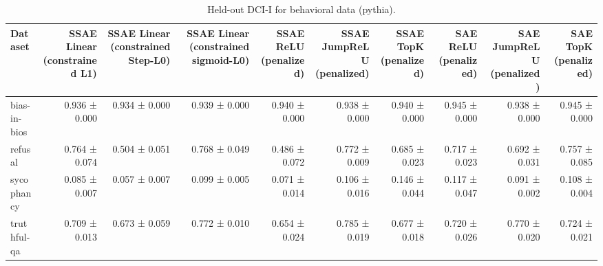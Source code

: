 \begin{table}[t]
\centering
\caption{Held-out DCI-I for behavioral data (pythia).}
\label{tab:behavioral-pythia-dci-i}
\begin{tabular}{lrrrrrrrrr}
\toprule
Dataset & SSAE Linear (constrained L1) & SSAE Linear (constrained Step-L0) & SSAE Linear (constrained sigmoid-L0) & SSAE ReLU (penalized) & SSAE JumpReLU (penalized) & SSAE TopK (penalized) & SAE ReLU (penalized) & SAE JumpReLU (penalized) & SAE TopK (penalized) \\
\midrule
bias-in-bios & 0.936 ± 0.000 & 0.934 ± 0.000 & 0.939 ± 0.000 & 0.940 ± 0.000 & 0.938 ± 0.000 & 0.940 ± 0.000 & 0.945 ± 0.000 & 0.938 ± 0.000 & 0.945 ± 0.000 \\
refusal & 0.764 ± 0.074 & 0.504 ± 0.051 & 0.768 ± 0.049 & 0.486 ± 0.072 & 0.772 ± 0.009 & 0.685 ± 0.023 & 0.717 ± 0.023 & 0.692 ± 0.031 & 0.757 ± 0.085 \\
sycophancy & 0.085 ± 0.007 & 0.057 ± 0.007 & 0.099 ± 0.005 & 0.071 ± 0.014 & 0.106 ± 0.016 & 0.146 ± 0.044 & 0.117 ± 0.047 & 0.091 ± 0.002 & 0.108 ± 0.004 \\
truthful-qa & 0.709 ± 0.013 & 0.673 ± 0.059 & 0.772 ± 0.010 & 0.654 ± 0.024 & 0.785 ± 0.019 & 0.677 ± 0.018 & 0.720 ± 0.026 & 0.770 ± 0.020 & 0.724 ± 0.021 \\
\bottomrule
\end{tabular}
\end{table}
